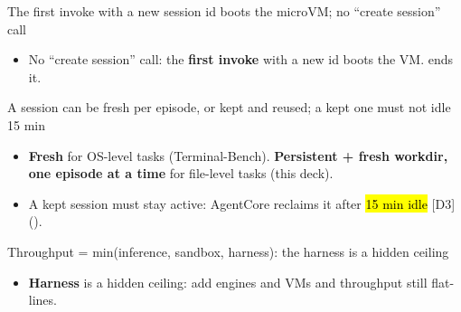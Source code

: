 \begin{frame}{The first invoke with a new session id boots the microVM; no ``create session'' call}
\centering
{}\par
\vspace{3mm}
\raggedright
\begin{itemize}\small
\item No ``create session'' call: the \textbf{first invoke} with a new id boots the VM.  ends it.
\end{itemize}
\end{frame}

\begin{frame}{A session can be fresh per episode, or kept and reused; a kept one must not idle 15 min}
\centering
{}\par
\vspace{2mm}
\raggedright
\begin{itemize}\small\setlength{\itemsep}{1mm}
\item \textbf{Fresh} for OS-level tasks (Terminal-Bench). \textbf{Persistent + fresh workdir, one episode at a time} for file-level tasks (this deck).
\item A kept session must stay active: AgentCore reclaims it after \hl{15 min idle} [D3] ().
\end{itemize}
\end{frame}


\begin{frame}{Throughput = min(inference, sandbox, harness): the harness is a hidden ceiling}
\centering
{}\par
\vspace{3mm}
\raggedright
\begin{itemize}\small
\item \textbf{Harness} is a hidden ceiling: add engines and VMs and throughput still flat-lines.
\end{itemize}
\end{frame}

